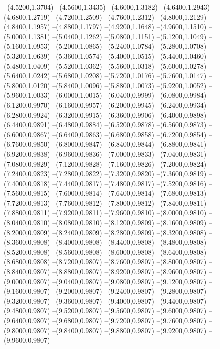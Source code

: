 {	--(4.5200,1.3704)
	--(4.5600,1.3435)
	--(4.6000,1.3182)
	--(4.6400,1.2943)
	--(4.6800,1.2719)
	--(4.7200,1.2509)
	--(4.7600,1.2312)
	--(4.8000,1.2129)
	--(4.8400,1.1957)
	--(4.8800,1.1797)
	--(4.9200,1.1648)
	--(4.9600,1.1510)
	--(5.0000,1.1381)
	--(5.0400,1.1262)
	--(5.0800,1.1151)
	--(5.1200,1.1049)
	--(5.1600,1.0953)
	--(5.2000,1.0865)
	--(5.2400,1.0784)
	--(5.2800,1.0708)
	--(5.3200,1.0639)
	--(5.3600,1.0574)
	--(5.4000,1.0515)
	--(5.4400,1.0460)
	--(5.4800,1.0409)
	--(5.5200,1.0362)
	--(5.5600,1.0318)
	--(5.6000,1.0278)
	--(5.6400,1.0242)
	--(5.6800,1.0208)
	--(5.7200,1.0176)
	--(5.7600,1.0147)
	--(5.8000,1.0120)
	--(5.8400,1.0096)
	--(5.8800,1.0073)
	--(5.9200,1.0052)
	--(5.9600,1.0033)
	--(6.0000,1.0015)
	--(6.0400,0.9999)
	--(6.0800,0.9984)
	--(6.1200,0.9970)
	--(6.1600,0.9957)
	--(6.2000,0.9945)
	--(6.2400,0.9934)
	--(6.2800,0.9924)
	--(6.3200,0.9915)
	--(6.3600,0.9906)
	--(6.4000,0.9898)
	--(6.4400,0.9891)
	--(6.4800,0.9884)
	--(6.5200,0.9878)
	--(6.5600,0.9873)
	--(6.6000,0.9867)
	--(6.6400,0.9863)
	--(6.6800,0.9858)
	--(6.7200,0.9854)
	--(6.7600,0.9850)
	--(6.8000,0.9847)
	--(6.8400,0.9844)
	--(6.8800,0.9841)
	--(6.9200,0.9838)
	--(6.9600,0.9836)
	--(7.0000,0.9833)
	--(7.0400,0.9831)
	--(7.0800,0.9829)
	--(7.1200,0.9828)
	--(7.1600,0.9826)
	--(7.2000,0.9824)
	--(7.2400,0.9823)
	--(7.2800,0.9822)
	--(7.3200,0.9820)
	--(7.3600,0.9819)
	--(7.4000,0.9818)
	--(7.4400,0.9817)
	--(7.4800,0.9817)
	--(7.5200,0.9816)
	--(7.5600,0.9815)
	--(7.6000,0.9814)
	--(7.6400,0.9814)
	--(7.6800,0.9813)
	--(7.7200,0.9813)
	--(7.7600,0.9812)
	--(7.8000,0.9812)
	--(7.8400,0.9811)
	--(7.8800,0.9811)
	--(7.9200,0.9811)
	--(7.9600,0.9810)
	--(8.0000,0.9810)
	--(8.0400,0.9810)
	--(8.0800,0.9810)
	--(8.1200,0.9809)
	--(8.1600,0.9809)
	--(8.2000,0.9809)
	--(8.2400,0.9809)
	--(8.2800,0.9809)
	--(8.3200,0.9808)
	--(8.3600,0.9808)
	--(8.4000,0.9808)
	--(8.4400,0.9808)
	--(8.4800,0.9808)
	--(8.5200,0.9808)
	--(8.5600,0.9808)
	--(8.6000,0.9808)
	--(8.6400,0.9808)
	--(8.6800,0.9808)
	--(8.7200,0.9807)
	--(8.7600,0.9807)
	--(8.8000,0.9807)
	--(8.8400,0.9807)
	--(8.8800,0.9807)
	--(8.9200,0.9807)
	--(8.9600,0.9807)
	--(9.0000,0.9807)
	--(9.0400,0.9807)
	--(9.0800,0.9807)
	--(9.1200,0.9807)
	--(9.1600,0.9807)
	--(9.2000,0.9807)
	--(9.2400,0.9807)
	--(9.2800,0.9807)
	--(9.3200,0.9807)
	--(9.3600,0.9807)
	--(9.4000,0.9807)
	--(9.4400,0.9807)
	--(9.4800,0.9807)
	--(9.5200,0.9807)
	--(9.5600,0.9807)
	--(9.6000,0.9807)
	--(9.6400,0.9807)
	--(9.6800,0.9807)
	--(9.7200,0.9807)
	--(9.7600,0.9807)
	--(9.8000,0.9807)
	--(9.8400,0.9807)
	--(9.8800,0.9807)
	--(9.9200,0.9807)
	--(9.9600,0.9807)
}
